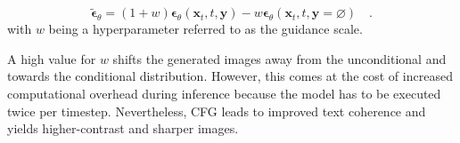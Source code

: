 \begin{equation}
	\tilde{\boldsymbol{\epsilon}}_\theta= (1+w)\boldsymbol{\epsilon}_\theta(\mathbf{x}_t, t,\mathbf{y} )  - w \boldsymbol{\epsilon}_\theta(\mathbf{x}_t, t,\mathbf{y} =\varnothing) \quad.
\end{equation} 
with $w$ being a hyperparameter referred to as the guidance scale. 

A high value for $w$ shifts the generated images away from the unconditional and towards the conditional distribution. However, this comes at the cost of increased computational overhead during inference because the model has to be executed twice per timestep. Nevertheless, \gls{CFG} leads to improved text coherence and yields higher-contrast and sharper images.
